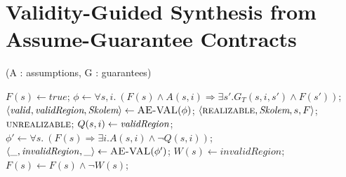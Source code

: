 \section{Validity-Guided Synthesis from Assume-Guarantee Contracts}
\label{sec:synthesis}

\begin{algorithm*}[!t]
\caption{\jsynvg (A : assumptions, G : guarantees)}
\label{alg:synthesis}
\begin{algorithmic}[1]
	\State $F(s) \gets \mathit{true}$\label{alg:init};
		\State $\phi \gets \forall s,i. \ (F(s) \land A(s,i) \Rightarrow \exists s'.G_{T}(s,i,s') \land F(s'))$\label{alg:ae1};
		\State $\langle \mathit{valid}, \textit{validRegion}, \textit{Skolem} \rangle \gets \textsc{AE-VAL}(\phi) \label{alg:val1}$;
				\Return $\langle \textsc{realizable}, \textit{Skolem}, s, F \rangle$\label{alg:issat};
		 		\Return $\textsc{unrealizable}$;
		 	\EndIf
			\State $Q(s,i) \gets \textit{validRegion}$\label{alg:valreg};
			\State $\phi' \gets \forall s. \ (F(s) \Rightarrow \exists i. A(s,i) \land \lnot
			Q(s,i))$\label{alg:ae2};
			\State $\langle \_, \mathit{invalidRegion}, \_ \rangle \gets \textsc{AE-VAL}(\phi')$;
				\State $W(s) \gets \mathit{invalidRegion}$;
			\State $F(s) \gets F(s) \land \lnot W(s)$\label{alg:rem};	
			
				
		\EndIf
	\EndWhile
\end{algorithmic}
\end{algorithm*}


